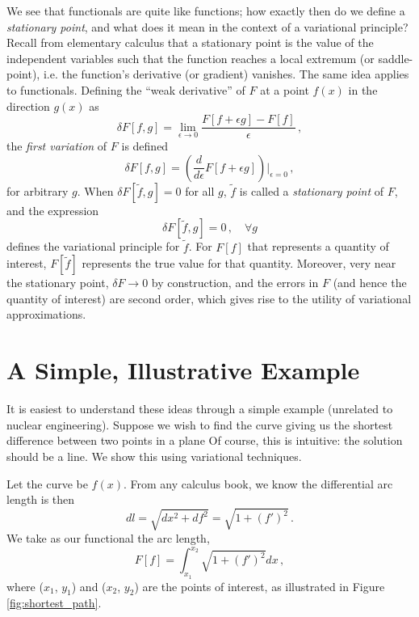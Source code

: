 We see that functionals are quite like functions; how exactly then do we 
define a \textit{stationary point}, and what does it mean in the context 
of a variational principle?  Recall from elementary calculus that a stationary 
point is the value of the independent variables such that the function reaches 
a local extremum (or saddle-point), i.e. the function's derivative (or 
gradient) vanishes.  The same idea applies to functionals.  Defining 
the ``weak derivative'' of $F$ at a point $f(x)$ in the direction $g(x)$ as
\begin{equation}
 \delta F[f,g] = \lim_{\epsilon \to 0} 
                 \frac{ F[f+\epsilon g] - F[f] }{\epsilon} \, ,
\end{equation}
the \textit{first variation} of $F$ is defined 
\begin{equation}
 \delta F[f,g] = \left ( \frac{d}{d\epsilon} F[f+\epsilon g] \right ) 
                 \Bigg |_{\epsilon = 0} \, ,
\end{equation}
for arbitrary $g$.  When $\delta F[\tilde{f},g] = 0$ for all $g$, $\tilde{f}$ 
is called a \textit{stationary point} of $F$, and the expression
\begin{equation}
 \delta F[\tilde{f},g] = 0 \, ,  \, \, \, \, \, \, \forall g 
\end{equation}
defines the variational principle for $\tilde{f}$.  For $F[f]$ that represents 
a quantity of interest, $F[\tilde{f}]$ represents the true value for that 
quantity.  Moreover, very near the stationary point, $\delta F \to 0$ by 
construction, and the errors in $F$ (and hence the quantity of interest) are 
second order, which gives rise to the utility of variational approximations.

\section*{A Simple, Illustrative Example}

It is easiest to understand these ideas through a simple example (unrelated 
to nuclear engineering).  Suppose we wish to find the curve giving us the 
shortest difference between two points in a plane  Of course, this is 
intuitive: the solution should be a line.  We show this using variational 
techniques.  

Let the curve be $f(x)$. From any calculus book, we know the differential arc 
length is then
\begin{equation}
 dl = \sqrt{ dx^2 + df^2 } = \sqrt{1 + (f')^2} \, .
\end{equation}
We take as our functional the arc length,
\begin{equation}
 F[f] = \int^{x_2}_{x_1} \sqrt{1 + (f')^2} dx \, ,
\end{equation}
where ($x_1$, $y_1$) and ($x_2$, $y_2$) are the points of interest, as 
illustrated in Figure \ref{fig:shortest_path}.

